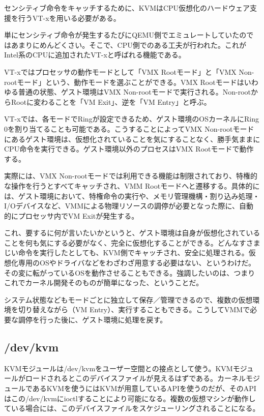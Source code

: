 ﻿\documentclass[9pt,b5paper,tombo,openany]{jsbook}
\begin{document}
センシティブ命令をキャッチするために、KVMはCPU仮想化のハードウェア支援を行うVT-xを用いる必要がある。

単にセンシティブ命令が発生するたびにQEMU側でエミュレートしていたのではあまりにめんどくさい。そこで、CPU側でのある工夫が行われた。これがIntel系のCPUに追加されたVT-xと呼ばれる機能である。

VT-xではプロセッサの動作モードとして「VMX Rootモード」と「VMX Non-rootモード」という、動作モードを選ぶことができる。VMX Rootモードはいわゆる普通の状態、ゲスト環境はVMX Non-rootモードで実行される。Non-rootからRootに変わることを「VM Exit」、逆を「VM Entry」と呼ぶ。

VT-xでは、各モードでRingが設定できるため、ゲスト環境のOSカーネルにRing 0を割り当てることも可能である。こうすることによってVMX Non-rootモードにあるゲスト環境は、仮想化されていることを気にすることなく、勝手気ままにCPU命令を実行できる。ゲスト環境以外のプロセスはVMX Rootモードで動作する。

実際には、VMX Non-rootモードでは利用できる機能は制限されており、特権的な操作を行うとすべてキャッチされ、VMM Rootモードへと遷移する。具体的には、ゲスト環境において、特権命令の実行や、メモリ管理機構・割り込み処理・I/Oデバイスなど、VMMによる物理リソースの調停が必要となった際に、自動的にプロセッサ内でVM Exitが発生する。

これ、要するに何が言いたいかというと、ゲスト環境は自身が仮想化されていることを何も気にする必要がなく、完全に仮想化することができる。どんなすさまじい命令を実行したとしても、KVM側でキャッチされ、安全に処理される。仮想化専用のOSやドライバなどをわざわざ用意する必要はない、というわけだ。その変に転がっているOSを動作させることもできる。強調したいのは、つまりこれでカーネル開発そのものが簡単になった、ということだ。

システム状態などもモードごとに独立して保存／管理できるので、複数の仮想環境を切り替えながら（VM Entry）、実行することもできる。こうしてVMMで必要な調停を行った後に、ゲスト環境に処理を戻す。

\subsection{/dev/kvm}

KVMモジュールは/dev/kvmをユーザー空間との接点として使う。KVMモジュールがロードされるとこのデバイスファイルが見えるはずである。カーネルモジュールであるKVMを使うにはKVMが用意しているAPIを使うのだが、そのAPIはこの/dev/kvmにioctlすることにより可能になる。複数の仮想マシンが動作している場合には、このデバイスファイルをスケジューリングされることになる。
\end{document}
